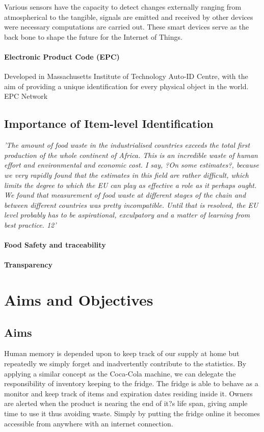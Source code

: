 \documentclass[a4paper, 11pt]{article}
\begin{document}
Various sensors have the capacity to detect changes externally ranging from atmospherical to the tangible, signals are emitted and received by other devices were necessary computations are carried out. These smart devices serve as the back bone to shape the future for the Internet of Things.


\paragraph{Electronic Product Code (EPC)}
Developed in Massachusetts Institute of Technology Auto-ID Centre, with the aim of providing a unique identification for every physical object in the world. EPC Network


\vspace{\baselineskip}
\vspace{\baselineskip}
\vspace{\baselineskip}

\subsection{Importance of Item-level Identification}
\emph{'The amount of food waste in the industrialised countries exceeds the total first
production of the whole continent of Africa. This is an incredible waste of human effort
and environmental and economic cost. I say, ?On some estimates?, because we very
rapidly found that the estimates in this field are rather difficult, which limits the degree
to which the EU can play as effective a role as it perhaps ought. We found that
measurement of food waste at different stages of the chain and between different
countries was pretty incompatible. Until that is resolved, the EU level probably has to
be aspirational, exculpatory and a matter of learning from best practice. 12'}
\paragraph{Food Safety and traceability}
\paragraph{Transparency}

\clearpage
\section{Aims and Objectives}
\subsection{Aims}
Human memory is depended upon to keep track of our supply at home but repeatedly we simply forget and inadvertently contribute to the statistics. By applying a similar concept as the Coca-Cola machine, we can delegate the responsibility of inventory keeping to the fridge. The fridge is able to behave as a monitor and keep track of items and expiration dates residing inside it. Owners are alerted when the product is nearing the end of it?s life span, giving ample time to use it thus avoiding waste. Simply by putting the fridge online it becomes accessible from anywhere with an internet connection.
\end{document}
